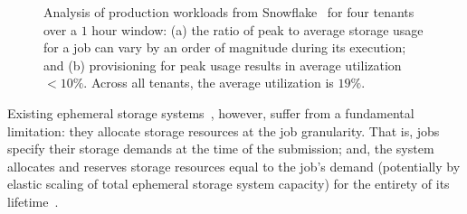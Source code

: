 \begin{figure}[t]
  \centering
  \caption[Snowflake workload anaylsis.]{\small{Analysis of production workloads from Snowflake~\cite{snowset} for four tenants over a $1$ hour window: (a) the ratio of peak to average storage usage for a job can vary by an order of magnitude during its execution; and (b) provisioning for peak usage results in average utilization $<10\%$. Across all tenants, the average utilization is $19\%$.}}\label{fig:ephemerals}%
\end{figure}

Existing ephemeral storage systems~\cite{locus, pocket}, however, suffer from a fundamental limitation: they allocate storage resources at the job granularity. That is, jobs specify their storage demands at the time of the submission; and, the system allocates and reserves storage resources equal to the job's demand (potentially by elastic scaling of total ephemeral storage system capacity) for the entirety of its lifetime~\cite[Figure 1]{pocket}. 

